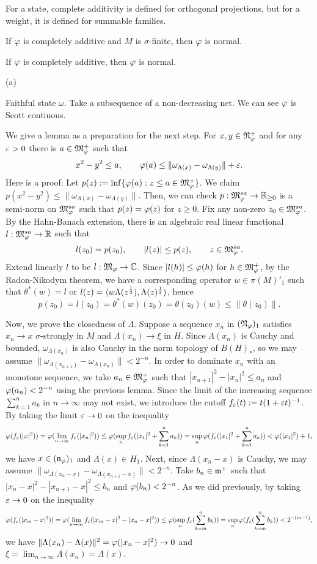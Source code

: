 \documentclass{../../large}
\begin{document}
\begin{prb}
For a state, complete additivity is defined for orthogonal projections, but for a weight, it is defined for summable families.
\begin{parts}
\item If $\varphi$ is completely additive and $M$ is $\sigma$-finite, then $\varphi$ is normal.
\item If $\varphi$ is completely additive, then $\varphi$ is normal.
\end{parts}
\end{prb}
\begin{pf}

(a)

Faithful state $\omega$.
Take a subsequence of a non-decreasing net.
We can see $\varphi$ is Scott contiuous.

We give a lemma as a preparation for the next step.
For $x,y\in\mathfrak{N}_\varphi^+$ and for any $\varepsilon>0$ there is $a\in\mathfrak{M}_\varphi^+$ such that
\[x^2-y^2\le a,\qquad\varphi(a)\le\|\omega_{\Lambda(x)}-\omega_{\Lambda(y)}\|+\varepsilon.\]
Here is a proof:
Let $p(z):=\inf\{\varphi(a):z\le a\in\mathfrak{M}_\varphi^+\}$.
We claim $p(x^2-y^2)\le\|\omega_{\Lambda(x)}-\omega_{\Lambda(y)}\|$.
Then, we can check $p:\mathfrak{M}_\varphi^{sa}\to\mathbb{R}_{\ge0}$ is a semi-norm on $\mathfrak{M}_\varphi^{sa}$ such that $p(z)=\varphi(z)$ for $z\ge0$.
Fix any non-zero $z_0\in\mathfrak{M}_\varphi^{sa}$.
By the Hahn-Banach extension, there is an algebraic real linear functional $l:\mathfrak{M}_\varphi^{sa}\to\mathbb{R}$ such that
\[l(z_0)=p(z_0),\qquad |l(z)|\le p(z),\qquad z\in\mathfrak{M}_\varphi^{sa}.\]
Extend linearly $l$ to be $l:\mathfrak{M}_\varphi\to\mathbb{C}$.
Since $|l(h)|\le\varphi(h)$ for $h\in\mathfrak{M}_\varphi^+$, by the Radon-Nikodym theorem, we have a corresponding operator $w\in\pi(M)'_1$ such that $\theta^*(w)=l$ or $l(z)=\langle w\Lambda(z^{\frac12}),\Lambda(z)^{\frac12})$, hence
\[p(z_0)=l(z_0)=\theta^*(w)(z_0)=\theta(z_0)(w)\le\|\theta(z_0)\|.\]


Now, we prove the closedness of $\Lambda$.
Suppose a sequence $x_n$ in $(\mathfrak{N}_\varphi)_1$ satisfies $x_n\to x$ $\sigma$-strongly in $M$ and $\Lambda(x_n)\to\xi$ in $H$.
Since $\Lambda(x_n)$ is Cauchy and bounded, $\omega_{\Lambda(x_n)}$ is also Cauchy in the norm topology of $B(H)_*$, so we may assume $\|\omega_{\Lambda(x_{n+1})}-\omega_{\Lambda(x_n)}\|<2^{-n}$.
In order to dominate $x_n$ with an monotone sequence, we take $a_n\in\mathfrak{M}_\varphi^+$ such that $|x_{n+1}|^2-|x_n|^2\le a_n$ and $\varphi(a_n)<2^{-n}$ using the previous lemma.
Since the limit of the increasing sequence $\sum_{k=1}^n a_k$ in $n\to\infty$ may not exist, we introduce the cutoff $f_\varepsilon(t):=t(1+\varepsilon t)^{-1}$.
By taking the limit $\varepsilon\to0$ on the inequality
\[\varphi(f_\varepsilon(|x|^2))=\varphi(\lim_{n\to\infty}f_\varepsilon(|x_n|^2))\le\varphi(\sup_nf_\varepsilon(|x_1|^2+\sum_{k=1}^na_k))=\sup_n\varphi(f_\varepsilon(|x_1|^2+\sum_{k=1}^na_k))<\varphi(|x_1|^2)+1,\]
we have $x\in(\mathfrak{n}_\varphi)_1$ and $\Lambda(x)\in H_1$.
Next, since $\Lambda(x_n-x)$ is Cauchy, we may assume $\|\omega_{\Lambda(x_n-x)}-\omega_{\Lambda(x_{n+1}-x)}\|<2^{-n}$.
Take $b_n\in\mathfrak{m}^+$ such that $|x_n-x|^2-|x_{n+1}-x|^2\le b_n$ and $\varphi(b_n)<2^{-n}$.
As we did previously, by taking $\varepsilon\to0$ on the inequality
\[\varphi(f_\varepsilon(|x_m-x|^2))=\varphi(\lim_{n\to\infty}f_\varepsilon(|x_m-x|^2-|x_n-x|^2))\le\varphi(\sup_nf_\varepsilon(\sum_{k=m}^nb_k))=\sup_n\varphi(f_\varepsilon(\sum_{k=m}^nb_k))<2^{-(m-1)},\]
we have $\|\Lambda(x_n)-\Lambda(x)\|^2=\varphi(|x_n-x|^2)\to0$ and $\xi=\lim_{n\to\infty}\Lambda(x_n)=\Lambda(x)$.


\end{pf}
\end{document}
